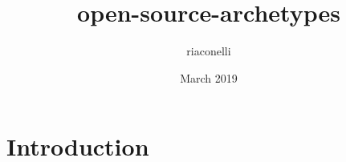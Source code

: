\documentclass{article}
\title{open-source-archetypes}
\author{riaconelli }
\date{March 2019}
\begin{document}
\maketitle

\section{Introduction}
\end{document}
